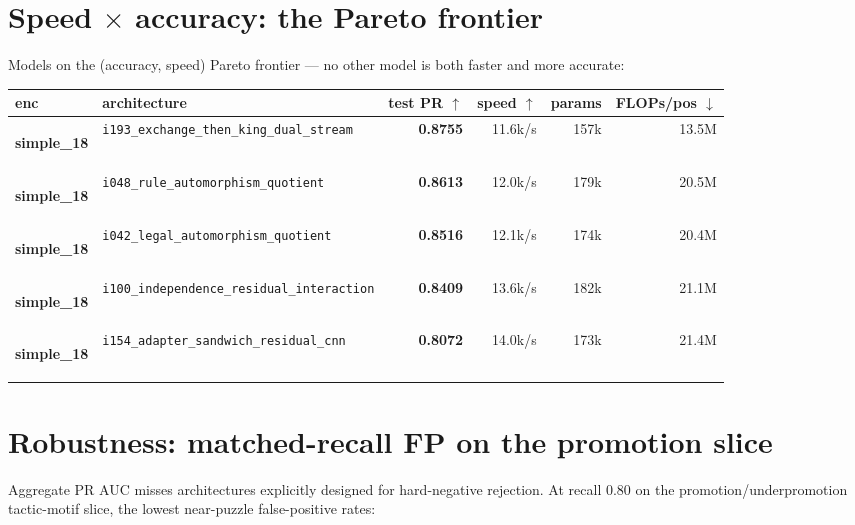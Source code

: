 \documentclass[10pt,a4paper]{article}
\newcommand{\pillsi}[0]{\colorbox{s18redbg}{\strut\textcolor{s18red}{\scriptsize\bfseries\sffamily simple\_18}}}
\begin{document}
\clearpage
\section{Speed $\times$ accuracy: the Pareto frontier}

Models on the (accuracy, speed) Pareto frontier --- no other model is both
faster and more accurate:


\begin{footnotesize}
\begin{tabularx}{\linewidth}{@{}l L r r r r@{}}
\toprule
\textbf{enc} & \textbf{architecture} & \textbf{test PR $\uparrow$} & \textbf{speed $\uparrow$} & \textbf{params} & \textbf{FLOPs/pos $\downarrow$} \\
\midrule
\pillsi{} & \texttt{i193\_exchange\_then\_king\_dual\_stream} & \textbf{0.8755} & 11.6k/s & 157k & 13.5M \\
\pillsi{} & \texttt{i048\_rule\_automorphism\_quotient} & \textbf{0.8613} & 12.0k/s & 179k & 20.5M \\
\pillsi{} & \texttt{i042\_legal\_automorphism\_quotient} & \textbf{0.8516} & 12.1k/s & 174k & 20.4M \\
\pillsi{} & \texttt{i100\_independence\_residual\_interaction} & \textbf{0.8409} & 13.6k/s & 182k & 21.1M \\
\pillsi{} & \texttt{i154\_adapter\_sandwich\_residual\_cnn} & \textbf{0.8072} & 14.0k/s & 173k & 21.4M \\
\bottomrule
\end{tabularx}
\end{footnotesize}


\section{Robustness: matched-recall FP on the promotion slice}\label{sec:robustness}

Aggregate PR AUC misses architectures explicitly designed for hard-negative
rejection. At recall $0.80$ on the promotion/underpromotion tactic-motif slice,
the lowest near-puzzle false-positive rates:
\end{document}

